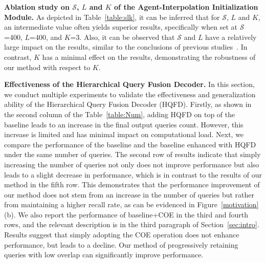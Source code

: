 \textbf{Ablation study on $\mathcal{S}$, $L$ and $K$ of the Agent-Interpolation Initialization Module.}
As depicted in Table~\ref{table:slk}, it can be inferred that for $\mathcal{S}$, $L$ and $K$, an intermediate value often yields superior results, specifically when set at $\mathcal{S}$=400, $L$=400, and $K$=3. Also, it can be observed that $\mathcal{S}$ and $L$ have a relatively large impact on the results, similar to the conclusions of previous studies~\cite{schult2022mask3d,lai2023mask}. In contrast, $K$ has a minimal effect on the results, demonstrating the robustness of our method with respect to $K$.

\textbf{Effectiveness of the Hierarchical Query Fusion Decoder.}
In this section, we conduct multiple experiments to validate the effectiveness and generalization ability of the Hierarchical Query Fusion Decoder (HQFD). Firstly, as shown in the second column of the Table~\ref{table:Num}, adding HQFD on top of the baseline leads to an increase in the final output queries count. However, this increase is limited and has minimal impact on computational load.
%
Next, we compare the performance of the baseline and the baseline enhanced with HQFD under the same number of queries.
%
The second row of results indicate that simply increasing the number of queries not only does not improve performance but also leads to a slight decrease in performance, which is in contrast to the results of our method in the fifth row. This demonstrates that the performance improvement of our method does not stem from an increase in the number of queries but rather from maintaining a higher recall rate, as can be evidenced in Figure~\ref{motivation} (b). We also report the performance of baseline+COE in the third and fourth rows, and the relevant description is in the third paragraph of Section~\ref{sec:intro}. Results suggest that simply adopting the COE operation does not enhance performance, but leads to a decline. Our method of progressively retaining queries with low overlap can significantly improve performance.

